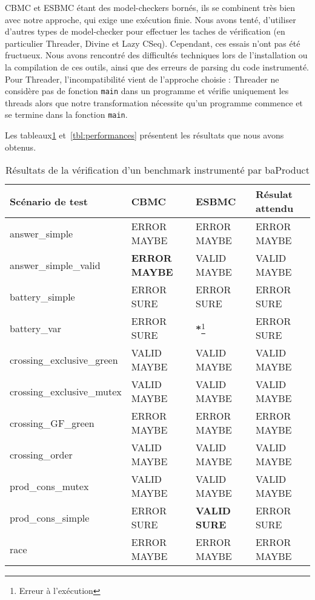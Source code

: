 CBMC et ESBMC étant des model-checkers bornés, ils se combinent très bien avec
notre approche, qui exige une exécution finie. Nous avons tenté, d'utiliser
d'autres types de model-checker pour effectuer les taches de vérification (en
particulier Threader, Divine et Lazy CSeq). Cependant, ces essais n'ont pas été
fructueux. Nous avons rencontré des difficultés techniques lors de
l'installation ou la compilation de ces outils, ainsi que des erreurs de parsing
du code instrumenté. Pour Threader, l'incompatibilité vient de l'approche
choisie : Threader ne considère pas de fonction \texttt{main} dans un programme
et vérifie uniquement les threads alors que notre transformation nécessite qu'un
programme commence et se termine dans la fonction \texttt{main}.

Les tableaux\ref{tbl:resultats} et~\ref{tbl:performances} présentent les
résultats que nous avons obtenus.

\begin{table}[tbp]
\centering
\caption{Résultats de la vérification d'un benchmark instrumenté par baProduct}
\label{tbl:resultats}
\begin{tabular}{|l|l|l|l|}
\hline
Scénario de test           & CBMC                 & ESBMC            & Résulat attendu \\
\hline
answer\_simple             & ERROR MAYBE          & ERROR MAYBE      & ERROR MAYBE     \\
answer\_simple\_valid      & \textbf{ERROR MAYBE} & VALID MAYBE      & VALID MAYBE     \\
battery\_simple            & ERROR SURE           & ERROR SURE       & ERROR SURE      \\
battery\_var               & ERROR SURE           & \textbf{*}\footnote{Erreur à l'exécution}& ERROR SURE      \\
crossing\_exclusive\_green & VALID MAYBE          & VALID MAYBE      & VALID MAYBE     \\
crossing\_exclusive\_mutex & VALID MAYBE          & VALID MAYBE      & VALID MAYBE     \\
crossing\_GF\_green        & ERROR MAYBE          & ERROR MAYBE      & ERROR MAYBE     \\
crossing\_order            & VALID MAYBE          & VALID MAYBE      & VALID MAYBE     \\
prod\_cons\_mutex          & VALID MAYBE          & VALID MAYBE      & VALID MAYBE     \\
prod\_cons\_simple         & ERROR SURE           & \textbf{VALID SURE} & ERROR SURE      \\
race                       & ERROR MAYBE          & ERROR MAYBE      & ERROR MAYBE     \\
\hline
\end{tabular}
\end{table}


